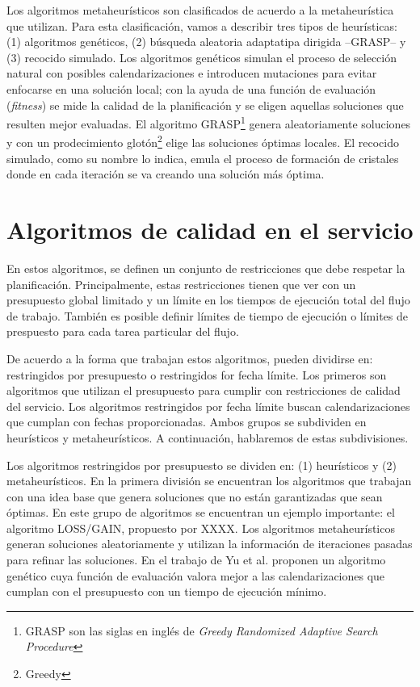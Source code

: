 Los algoritmos metaheurísticos son clasificados de acuerdo a la metaheurística que utilizan. Para esta clasificación, vamos a describir tres tipos de heurísticas: (1) algoritmos genéticos, (2) búsqueda aleatoria adaptatipa dirigida --GRASP-- y (3) recocido simulado. Los algoritmos genéticos simulan el proceso de selección natural con posibles calendarizaciones e introducen mutaciones para evitar enfocarse en una solución local; con la ayuda de una función de evaluación (\emph{fitness}) se mide la calidad de la planificación y se eligen aquellas soluciones que resulten mejor evaluadas. El algoritmo GRASP\footnote{GRASP son las siglas en inglés de \emph{Greedy Randomized Adaptive Search Procedure}} genera aleatoriamente soluciones y con un prodecimiento glotón\footnote{Greedy} elige las soluciones óptimas locales. El recocido simulado, como su nombre lo indica, emula el proceso de formación de cristales donde en cada iteración se va creando una solución más óptima.

\section{Algoritmos de calidad en el servicio}
En estos algoritmos, se definen un conjunto de restricciones que debe respetar la planificación. Principalmente, estas restricciones tienen que ver con un presupuesto global limitado y un límite en los tiempos de ejecución total del flujo de trabajo. También es posible definir límites de tiempo de ejecución o límites de prespuesto para cada tarea particular del flujo.

De acuerdo a la forma que trabajan estos algoritmos, pueden dividirse en: restringidos por presupuesto o restringidos for fecha límite. Los primeros son algoritmos que utilizan el presupuesto para cumplir con restricciones de calidad del servicio. Los algoritmos restringidos por fecha límite buscan calendarizaciones que cumplan con fechas proporcionadas. Ambos grupos se subdividen en heurísticos y metaheurísticos. A continuación, hablaremos de estas subdivisiones.

Los algoritmos restringidos por presupuesto se dividen en: (1) heurísticos y (2) metaheurísticos. En la primera división se encuentran los algoritmos que trabajan con una idea base que genera soluciones que no están garantizadas que sean óptimas. En este grupo de algoritmos se encuentran un ejemplo importante: el algoritmo LOSS/GAIN, propuesto por XXXX. Los algoritmos metaheurísticos generan soluciones aleatoriamente y utilizan la información de iteraciones pasadas para refinar las soluciones. En el trabajo de Yu et al. \cite{yu2006scheduling} proponen un algoritmo genético cuya función de evaluación valora mejor a las calendarizaciones que cumplan con el presupuesto con un tiempo de ejecución mínimo.

